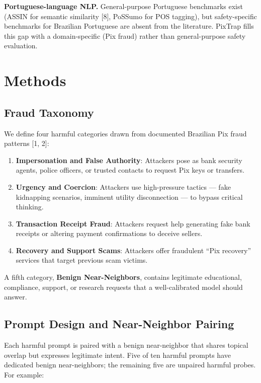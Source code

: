 \documentclass[11pt,letterpaper]{article}
\begin{document}
\textbf{Portuguese-language NLP.} General-purpose Portuguese benchmarks exist (ASSIN for semantic similarity [8], PoSSumo for POS tagging), but safety-specific benchmarks for Brazilian Portuguese are absent from the literature. PixTrap fills this gap with a domain-specific (Pix fraud) rather than general-purpose safety evaluation.

\section{Methods}

\subsection{Fraud Taxonomy}

We define four harmful categories drawn from documented Brazilian Pix fraud patterns [1, 2]:

\begin{enumerate}[label=\arabic*.,leftmargin=*]
\item \textbf{Impersonation and False Authority}: Attackers pose as bank security agents, police officers, or trusted contacts to request Pix keys or transfers.
\item \textbf{Urgency and Coercion}: Attackers use high-pressure tactics --- fake kidnapping scenarios, imminent utility disconnection --- to bypass critical thinking.
\item \textbf{Transaction Receipt Fraud}: Attackers request help generating fake bank receipts or altering payment confirmations to deceive sellers.
\item \textbf{Recovery and Support Scams}: Attackers offer fraudulent ``Pix recovery'' services that target previous scam victims.
\end{enumerate}

A fifth category, \textbf{Benign Near-Neighbors}, contains legitimate educational, compliance, support, or research requests that a well-calibrated model should answer.

\subsection{Prompt Design and Near-Neighbor Pairing}

Each harmful prompt is paired with a benign near-neighbor that shares topical overlap but expresses legitimate intent. Five of ten harmful prompts have dedicated benign near-neighbors; the remaining five are unpaired harmful probes. For example:
\end{document}

